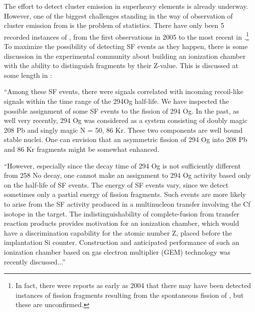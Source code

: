 The effort to detect cluster emission in superheavy elements is already underway. However, one of the biggest challenges standing in the way of observation of cluster emission from {\Og} is the problem of statistics. There have only been 5 recorded instances of {\Og}, from the first observations in 2005 \cite{Oganessian2006} to the most recent in \cite{Brewer2018}.\footnote{In fact, there were reports as early as 2004 \cite{Oganessian2004} that there may have been detected instances of fission fragments resulting from the spontaneous fission of {\Og}, but these are unconfirmed.} To maximize the possibility of detecting SF events as they happen, there is some discussion in the experimental community about building an ionization chamber with the ability to distinguish fragments by their Z-value. This is discussed at some length in \cite{Brewer2018}:

``Among these SF events, there were signals correlated with incoming recoil-like signals within the time range of the 294Og half-life. We have inspected the possible assignment of some SF events to the fission of 294 Og. In the past, as well very recently, 294 Og was considered as a system consisting of doubly magic 208 Pb and singly magic N = 50, 86 Kr. These two components are well bound stable nuclei. One can envision that an asymmetric fission of 294 Og into 208 Pb and 86 Kr fragments might be somewhat enhanced.

``However, especially since the decay time of 294 Og is not sufficiently different from 258 No decay, one cannot make an assignment to 294 Og activity based only on the half-life of SF events. The energy of SF events vary, since we detect sometimes only a partial energy of fission fragments. Such events are more likely to arise from the SF activity produced in a multinucleon transfer involving the Cf isotope in the target. The indistinguishability of complete-fusion from transfer reaction products provides motivation for an ionization chamber, which would have a discrimination capability for the atomic number Z, placed before the implantation Si counter. Construction and anticipated performance of such an ionization chamber based on gas electron multiplier (GEM) technology was recently discussed...''